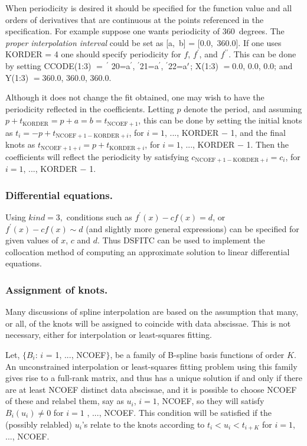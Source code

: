 \documentclass[twoside]{MATH77}
\begin{document}
When periodicity is desired it should be specified for the function value
and all orders of derivatives that are continuous at the points referenced in
the specification. For example suppose one wants periodicity of 360~degrees.
The {\em proper interpolation interval} could be set as [a,~b] = [0.0,~360.0].
If one uses KORDER = 4 one should specify periodicity for $f$, $f^{\prime}$,
and $f^{\prime \prime}$. This can be done by setting CCODE(1:3) $=\,^{\prime}$%
20=a$^{\prime}$, $^{\prime}$21=a$^{\prime}$, $^{\prime}$22=a$^{%
\prime}$; X(1:3) $= 0.0$, 0.0, 0.0; and Y(1:3) $= 360.0$, 360.0, 360.0.

Although it does not change the fit obtained, one may wish to have the
periodicity reflected in the coefficients. Letting $p$ denote the period, and
assuming $p+t_{\text{KORDER}} = p+a = b = t_{\text{NCOEF}+1}$, this can be done
by setting the initial knots as $t_i = -p+t_{\text{NCOEF}+1-\text{KORDER}+i}$,
for $i = 1$, ..., KORDER $-$ 1, and the final knots as $t_{\text{NCOEF}+1+i}
= p+t_{\text{KORDER}+i}$, for $i = 1$, ..., KORDER $-$ 1. Then the
coefficients will reflect the periodicity by satisfying $c_{\text{NCOEF}+1-%
\text{KORDER}+i} = c_i$, for $i = 1$, ..., KORDER $-$ 1.

\subsubsection{Differential equations.}

Using $kind = 3,$ conditions such as $f^{\prime}(x) - c f(x) = d$, or $%
f^{\prime}(x) - c f(x) \sim d$ (and slightly more general expressions) can be
specified for given values of $x$, $c$ and $d$. Thus DSFITC can be used to
implement the collocation method of computing an approximate solution to
linear differential equations.

\subsubsection{Assignment of knots.}

Many discussions of spline interpolation are based on the assumption that
many, or all, of the knots will be assigned to coincide with data abscissae.
This is not necessary, either for interpolation or least-squares fitting.

Let, $\{B_i$: $i$ = 1, ..., NCOEF$\}$, be a family of B-spline basis
functions of order $K$. An unconstrained interpolation or least-squares
fitting problem using this family gives rise to a full-rank matrix, and thus
has a unique solution if and only if there are at least NCOEF distinct data
abscissae, and it is possible to choose NCOEF of these and relabel them, say
as $u_i$, $i = 1$, NCOEF, so they will satisfy $B_i(u_i) \neq 0$ for $i = 1$%
, ..., NCOEF. This condition will be satisfied if the (possibly relabled) $%
u_i$'s relate to the knots according to $t_i < u_i < t_{i+K}$ for $i
= 1$, ..., NCOEF.
\end{document}
